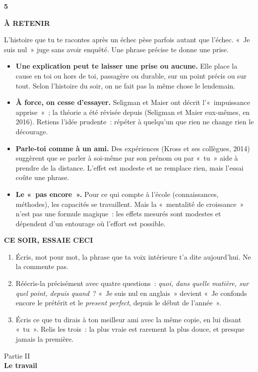 \documentclass[10pt,twoside,openany]{book}
\newenvironment{aretenir}[1][À retenir]{\par\begin{tcolorbox}[enhanced,colback=creme,colframe=accent,boxrule=0pt,leftrule=3pt,arc=0pt,left=8pt,right=8pt,top=5pt,bottom=5pt,breakable]{\small\bfseries\color{accent}\MakeUppercase{#1}}\par\smallskip}{\end{tcolorbox}\par}
\newenvironment{cesoir}[1][Ce soir, essaie ceci]{\par\begin{tcolorbox}[enhanced,colback=white,colframe=vert,boxrule=0.6pt,arc=2pt,left=8pt,right=8pt,top=5pt,bottom=5pt,breakable]{\small\bfseries\color{vert}\MakeUppercase{#1}}\par\smallskip\small}{\end{tcolorbox}\par}
\newcommand{\fiche}[3]{\clearpage\markright{#2}\thispagestyle{plain}%
 {\noindent\color{accent}\fontsize{40}{40}\selectfont\bfseries #1}\hspace{0.6em}{\Large\bfseries #2\par}\vspace{0.1em}{\small\color{gris}\itshape #3\par}\vspace{0.5em}}
\newcommand{\partie}[2]{\clearpage\thispagestyle{empty}\vspace*{\fill}\begin{center}{\large\color{gris}Partie #1}\\[1em]{\Huge\bfseries #2}\end{center}\vspace*{\fill}\clearpage}
\begin{document}
\fiche{5}{La voix de dedans}{Chapitre 5 du livre}
\begin{aretenir}
L’histoire que tu te racontes après un échec pèse parfois autant que l’échec. « Je suis nul » juge sans avoir enquêté. Une phrase précise te donne une prise.
\end{aretenir}
\begin{itemize}
\item \textbf{Une explication peut te laisser une prise ou aucune.} Elle place la cause en toi ou hors de toi, passagère ou durable, sur un point précis ou sur tout. Selon l’histoire du soir, on ne fait pas la même chose le lendemain.
\item \textbf{À force, on cesse d’essayer.} Seligman et Maier ont décrit l’« impuissance apprise » ; la théorie a été révisée depuis (Seligman et Maier eux-mêmes, en 2016). Retiens l’idée prudente : répéter à quelqu’un que rien ne change rien le décourage.
\item \textbf{Parle-toi comme à un ami.} Des expériences (Kross et ses collègues, 2014) suggèrent que se parler à soi-même par son prénom ou par « tu » aide à prendre de la distance. L’effet est modeste et ne remplace rien, mais l’essai coûte une phrase.
\item \textbf{Le « pas encore ».} Pour ce qui compte à l’école (connaissances, méthodes), les capacités se travaillent. Mais la « mentalité de croissance » n’est pas une formule magique : les effets mesurés sont modestes et dépendent d’un entourage où l’effort est possible.
\end{itemize}
\begin{cesoir}
\begin{enumerate}
\item Écris, mot pour mot, la phrase que ta voix intérieure t’a dite aujourd’hui. Ne la commente pas.
\item Réécris-la précisément avec quatre questions : \emph{quoi, dans quelle matière, sur quel point, depuis quand} ? « Je suis nul en anglais » devient « Je confonds encore le prétérit et le \emph{present perfect}, depuis le début de l’année ».
\item Écris ce que tu dirais à ton meilleur ami avec la même copie, en lui disant « tu ». Relis les trois : la plus vraie est rarement la plus douce, et presque jamais la première.
\end{enumerate}
\end{cesoir}

\partie{II}{Le travail}
\end{document}
